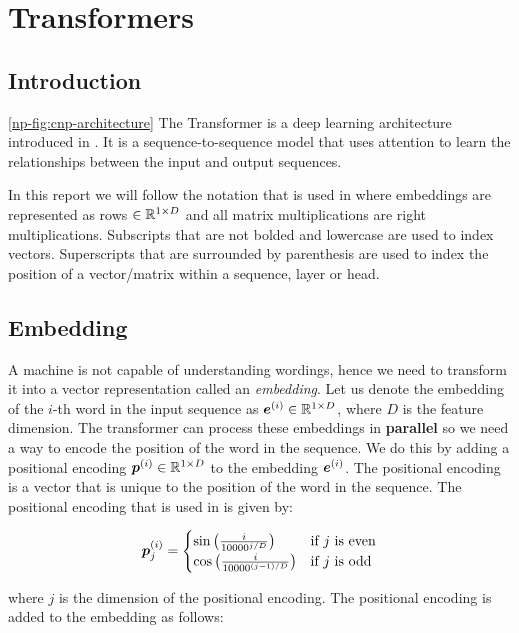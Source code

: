\documentclass[../../main.tex]{subfiles}
\begin{document}
\section{Transformers}
\subsection{Introduction}
\autoref{np-fig:cnp-architecture}
The Transformer is a deep learning architecture introduced in \cite{vaswani2017attention}. It is a sequence-to-sequence model that uses attention to learn the relationships between the input and output sequences.

In this report we will follow the notation that is used in \cite{vaswani2017attention} where embeddings are represented as rows $\in \mathbb{R}^{1 \times D}$ and all matrix multiplications are right multiplications. Subscripts that are not bolded and lowercase are used to index vectors. Superscripts that are surrounded by parenthesis are used to index the position of a vector/matrix within a sequence, layer or head. 

\subsection{Embedding}

A machine is not capable of understanding wordings, hence we need to transform it into a vector representation called an \emph{embedding}. Let us denote the embedding of the $i$-th word in the input sequence as $\bm{e}^{(i)} \in \mathbb{R}^{1 \times D}$, where $D$ is the feature dimension. The transformer can process these embeddings in \textbf{parallel} so we need a way to encode the position of the word in the sequence. We do this by adding a positional encoding $\bm{p}^{(i)} \in \mathbb{R}^{1 \times D}$ to the embedding $\bm{e}^{(i)}$. The positional encoding is a vector that is unique to the position of the word in the sequence. The positional encoding that is used in \cite{vaswani2017attention} is given by:

\begin{equation}
	\label{pe}
	\bm{p}_j^{(i)} = \begin{cases}
		\sin\left(\frac{i}{10000^{j/D}}\right) & \text{if } j \text{ is even} \\
		\cos\left(\frac{i}{10000^{(j-1)/D}}\right) & \text{if } j \text{ is odd}
	\end{cases}
\end{equation}

\noi where $j$ is the dimension of the positional encoding. The positional encoding is added to the embedding as follows:
\end{document}
